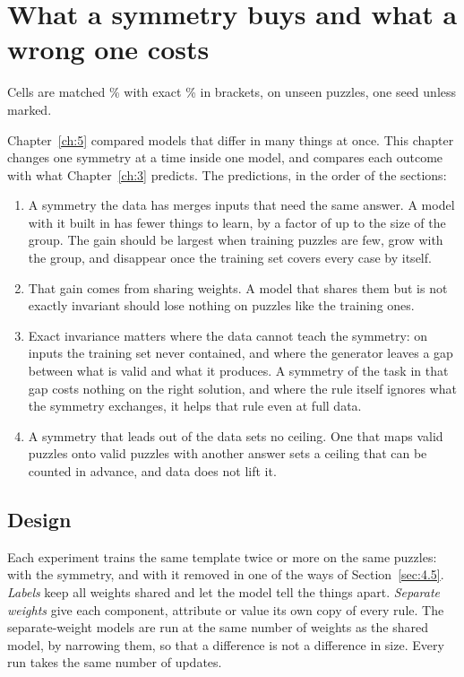 \chapter{What a symmetry buys and what a wrong one costs}\label{ch:6}

Cells are matched \% with exact \% in brackets, on unseen puzzles, one seed unless marked.

Chapter~\ref{ch:5} compared models that differ in many things at once. This chapter changes one symmetry at a time inside one model, and compares each outcome with what Chapter~\ref{ch:3} predicts. The predictions, in the order of the sections:

\begin{enumerate}
\item A symmetry the data has merges inputs that need the same answer. A model with it built in has fewer things to learn, by a factor of up to the size of the group. The gain should be largest when training puzzles are few, grow with the group, and disappear once the training set covers every case by itself.
\item That gain comes from sharing weights. A model that shares them but is not exactly invariant should lose nothing on puzzles like the training ones.
\item Exact invariance matters where the data cannot teach the symmetry: on inputs the training set never contained, and where the generator leaves a gap between what is valid and what it produces. A symmetry of the task in that gap costs nothing on the right solution, and where the rule itself ignores what the symmetry exchanges, it helps that rule even at full data.
\item A symmetry that leads out of the data sets no ceiling. One that maps valid puzzles onto valid puzzles with another answer sets a ceiling that can be counted in advance, and data does not lift it.
\end{enumerate}

\section{Design}\label{sec:6.1}

Each experiment trains the same template twice or more on the same puzzles: with the symmetry, and with it removed in one of the ways of Section~\ref{sec:4.5}. \emph{Labels} keep all weights shared and let the model tell the things apart. \emph{Separate weights} give each component, attribute or value its own copy of every rule. The separate-weight models are run at the same number of weights as the shared model, by narrowing them, so that a difference is not a difference in size. Every run takes the same number of updates.

